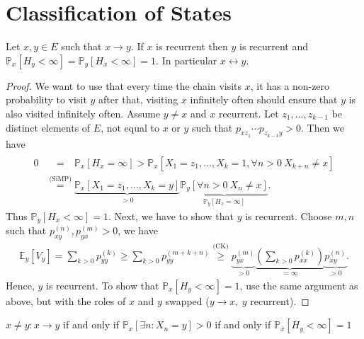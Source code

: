 \section{Classification of States}
\begin{theorem}[]
	Let $x,y \in E$ such that $x \to y$. If $x $ is recurrent then $y$ is recurrent and $\mathbb{P}_{x} \left[ H_y<\infty \right] = \mathbb{P}_{y} \left[ H_x<\infty \right]=1 $.
	In particular $x \leftrightarrow y$.
\end{theorem}
\begin{proof}
	We want to use that every time the chain visits $x$, it has a non-zero probability to visit $y$ after that, visiting $x$ infinitely often should ensure that $y$ is also visited infinitely often.
	Assume $y \neq x$ and $x$ recurrent. Let $z_1, \ldots, z_{k-1}$ be distinct elements of $E$, not equal to $x$ or $y$ such that $p_{xz_1}\cdots p_{z_{k-1}y}>0$. Then we have
	\begin{align}
		0 &\stackrel{\phantom{\textrm{(SiMP)}}}{=} \mathbb{P}_{x} \left[ H_x = \infty \right]  
			> \mathbb{P}_{x} \left[ X_1=z_1, \ldots, X_k=1, \forall n> 0\ X_{k+n} \neq x \right]  \\
		  &\stackrel{\textrm{(SiMP)}}{=} \underbrace{\mathbb{P}_{x} \left[ X_1 = z_1, \ldots, X_k=y \right]}_{>0}
		  \underbrace{\mathbb{P}_{y} \left[ \forall n> 0\ X_n \neq x \right]}_{\mathbb{P}_{y} \left[ H_x = \infty \right]}  
	.\end{align}
Thus $\mathbb{P}_{y} \left[ H_x < \infty \right] =1$.
Next, we have to show that $y$ is recurrent. Choose $m,n$ such that $p_{xy}^{(n)}, p_{yx}^{(m)}>0$, we have
\begin{align}
	\mathbb{E}_{y} \left[ V_y \right] = \sum_{k> 0}^{} p_{yy}^{(k)} \geq \sum_{k> 0}^{} p_{yy}^{(m+k+n)} \stackrel{\textrm{(CK)}}{\geq} \underbrace{p_{yx}^{(m)}}_{>0} \underbrace{\left( \sum_{k> 0}^{} p_{xx}^{(k)} \right)}_{=\infty} \underbrace{ p_{xy}^{(n)}}_{> 0}.
\end{align}
Hence, $y$ is recurrent. To show that $\mathbb{P}_{x} \left[ H_y < \infty \right] = 1$, use the same argument as above, but with the roles of $x$ and $y$ swapped ($y \to x,\ y$ recurrent).
\end{proof}


\begin{rmk}[]
	$x \neq y: x \to y$ if and only if $\mathbb{P}_{x} \left[ \exists n: X_n=y \right]>0$ if and only if $ \mathbb{P}_{x} \left[ H_y<\infty \right]=1 $
\end{rmk}

